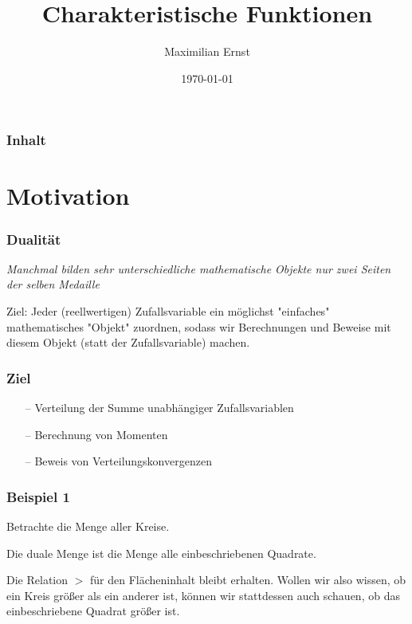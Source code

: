 \documentclass{beamer}
\begin{document}
\title{Charakteristische Funktionen}
\author{Maximilian Ernst}
\date{\today}
\begin{frame}
\titlepage
\end{frame}

\begin{frame}\frametitle{Inhalt}\tableofcontents\end{frame}

\section{Motivation}
\begin{frame}
\frametitle{Dualität}
\textit{Manchmal bilden sehr unterschiedliche mathematische Objekte nur zwei Seiten der selben Medaille}

\hfill \newline
\hfill \newline

Ziel: Jeder (reellwertigen) Zufallsvariable ein möglichst "einfaches" mathematisches "Objekt" zuordnen, sodass wir Berechnungen und Beweise mit diesem Objekt (statt der Zufallsvariable) machen.
\end{frame}

\begin{frame}
\frametitle{Ziel}
\begin{itemize}
    \setlength\itemsep{1em}
    \item[--] Verteilung der Summe unabhängiger Zufallsvariablen
    \item[--] Berechnung von Momenten
    \item[--] Beweis von Verteilungskonvergenzen
\end{itemize}
\end{frame}

\begin{frame}
\frametitle{Beispiel 1}
Betrachte die Menge aller Kreise.

Die duale Menge ist die Menge alle einbeschriebenen Quadrate.

Die Relation $>$ für den Flächeninhalt bleibt erhalten. Wollen wir also wissen, ob ein Kreis größer als ein anderer ist, können wir stattdessen auch schauen, ob das einbeschriebene Quadrat größer ist.
\end{frame}
\end{document}
